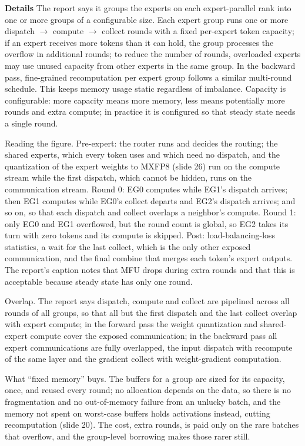 \documentclass[11pt,letterpaper]{article}
\newcommand{\para}[1]{\medskip\noindent\textbf{#1}\quad}
\begin{document}
\para{Details} The report says it groups the experts on each expert-parallel rank into one or more groups of a configurable size. Each expert group runs one or more dispatch $\to$ compute $\to$ collect rounds with a fixed per-expert token capacity; if an expert receives more tokens than it can hold, the group processes the overflow in additional rounds; to reduce the number of rounds, overloaded experts may use unused capacity from other experts in the same group. In the backward pass, fine-grained recomputation per expert group follows a similar multi-round schedule. This keeps memory usage static regardless of imbalance. Capacity is configurable: more capacity means more memory, less means potentially more rounds and extra compute; in practice it is configured so that steady state needs a single round.

Reading the figure. Pre-expert: the router runs and decides the routing; the shared experts, which every token uses and which need no dispatch, and the quantization of the expert weights to MXFP8 (slide 26) run on the compute stream while the first dispatch, which cannot be hidden, runs on the communication stream. Round 0: EG0 computes while EG1's dispatch arrives; then EG1 computes while EG0's collect departs and EG2's dispatch arrives; and so on, so that each dispatch and collect overlaps a neighbor's compute. Round 1: only EG0 and EG1 overflowed, but the round count is global, so EG2 takes its turn with zero tokens and its compute is skipped. Post: load-balancing-loss statistics, a wait for the last collect, which is the only other exposed communication, and the final combine that merges each token's expert outputs. The report's caption notes that MFU drops during extra rounds and that this is acceptable because steady state has only one round.

Overlap. The report says dispatch, compute and collect are pipelined across all rounds of all groups, so that all but the first dispatch and the last collect overlap with expert compute; in the forward pass the weight quantization and shared-expert compute cover the exposed communication; in the backward pass all expert communications are fully overlapped, the input dispatch with recompute of the same layer and the gradient collect with weight-gradient computation.

What ``fixed memory'' buys. The buffers for a group are sized for its capacity, once, and reused every round; no allocation depends on the data, so there is no fragmentation and no out-of-memory failure from an unlucky batch, and the memory not spent on worst-case buffers holds activations instead, cutting recomputation (slide 20). The cost, extra rounds, is paid only on the rare batches that overflow, and the group-level borrowing makes those rarer still.
\end{document}
